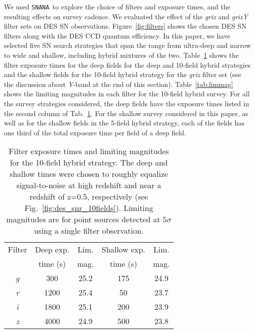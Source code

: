 \documentclass[preprint2]{aastex}    %
\newcommand{\snana}{{\tt SNANA}}
\begin{document}
We used \snana\ to %
explore the choice of filters and exposure times, 
and the resulting effects on survey cadence.
We evaluated the effect of the \textit{griz} and \textit{grizY} filter sets on DES SN observations. 
Figure~\ref{fig:filters} shows the chosen DES SN filters along with the DES CCD quantum 
efficiency. In this paper, we have selected five SN search strategies that span the range from 
ultra-deep and narrow to wide and shallow, including hybrid mixtures of the two. 
Table~\ref{tab:times} shows the filter exposure times for 
the deep fields for the deep and 10-field hybrid strategies and the shallow fields for 
the 10-field hybrid strategy for the \textit{griz} filter set (see the discussion about \textit{Y}-band at 
the end of this section). Table~\ref{tab:limmag} shows the limiting magnitudes in each 
filter for the 10-field hybrid survey.
For all the survey strategies considered, the deep fields have the exposure times listed in the 
second column of Tab.~\ref{tab:times}. For the shallow survey considered in this paper, as well
as for the shallow fields in the 5-field hybrid strategy, 
each of the fields has one third of the total exposure time per field of a deep field. 

\begin{table}[h]
\begin{center}
\begin{tabular}{ccccc}
\hline
Filter & Deep exp. & Lim. & Shallow exp. & Lim.\\
       & time (s) & mag.  & time (s) &mag.\\\hline
\textit{g} & 300  &25.2& 175 &24.9\\
\textit{r} & 1200 &25.4& 50 &23.7\\
\textit{i} & 1800 &25.1& 200 &23.9\\
\textit{z} & 4000 &24.9& 500 &23.8\\
\hline
\end{tabular}
\caption{Filter exposure times and limiting magnitudes for the 10-field hybrid strategy. 
The deep and shallow times were
chosen to roughly equalize signal-to-noise at high redshift and near a 
redshift of z=0.5, respectively (see Fig.~\ref{fig:des_snr_10fields}).
Limiting magnitudes are for point sources detected at $5\sigma$
using a single filter observation.\label{tab:times}}
\end{center}
\end{table}
\end{document}

